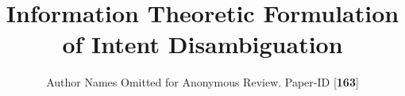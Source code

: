 \documentclass[conference]{IEEEtran}
\begin{document}
\title{Information Theoretic Formulation of Intent Disambiguation}
\author{Author Names Omitted for Anonymous Review. Paper-ID [\textbf{163}]}




% 
%	
%	
%	
%	

\maketitle
\end{document}
